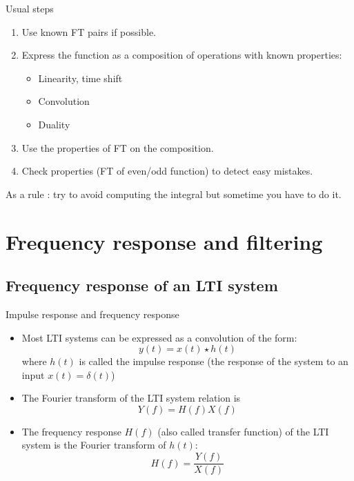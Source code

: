   \begin{block}{Usual steps}
    \begin{enumerate}
      \item Use known FT pairs if possible.
      \item Express the function as a composition of operations with known properties:
        \begin{itemize}
          \item Linearity, time shift
          \item Convolution
          \item Duality
        \end{itemize}
      \item Use the properties of FT on the composition.
      \item Check properties (FT of even/odd function) to detect easy mistakes.
    \end{enumerate}
    As a rule : try to avoid computing the integral but sometime you have to do it.
  \end{block}


   

\section{Frequency response and filtering}
\label{sec:freq-response}

\subsection{Frequency response of an LTI system}
\label{sec:}

\begin{block}{Impulse response and frequency response}
    \begin{itemize}
      \item Most LTI systems can be expressed as a convolution of the form:
     $$y(t)=x(t)\star h(t)$$
     where $h(t)$ is called the impulse response (the response of the system to an input $x(t)=\delta(t)$)
     \item The Fourier transform of the LTI system relation is
     \begin{equation}
      \label{eq:rep_freq_syst}
      Y(f)=H(f)X(f)
    \end{equation}
    \item The frequency response $H(f)$ (also called transfer function) of the LTI system is the Fourier transform of $h(t)$:
    \begin{equation}
      \label{eq:rep_freq_syst2}
      H(f)=\frac{Y(f)}{X(f)}
    \end{equation}
    \end{itemize}

  \end{block}


